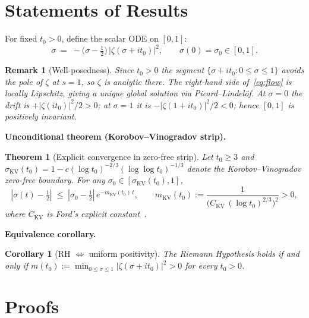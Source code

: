 \documentclass[11pt]{article}
\newtheorem{theorem}{Theorem}
\newtheorem{corollary}{Corollary}
\newtheorem{remark}{Remark}
\begin{document}
\section{Statements of Results}

For fixed $t_0>0$, define the scalar ODE on $[0,1]$:
\begin{equation}\label{eq:flow}
  \dot\sigma \;=\; -\bigl(\sigma-\tfrac12\bigr)\,|\zeta(\sigma+it_0)|^2,
  \qquad \sigma(0)=\sigma_0\in[0,1].
\end{equation}

\begin{remark}[Well-posedness]\label{rem:wp}
Since $t_0>0$ the segment $\{\sigma+it_0:0\le\sigma\le1\}$ avoids the
pole of $\zeta$ at $s=1$, so $\zeta$ is analytic there.
The right-hand side of~\eqref{eq:flow} is locally Lipschitz, giving a
unique global solution via Picard--Lindel\"of.
At $\sigma=0$ the drift is $+|\zeta(it_0)|^2/2>0$; at $\sigma=1$ it is
$-|\zeta(1+it_0)|^2/2<0$; hence $[0,1]$ is positively invariant.
\end{remark}

\noindent\textbf{Unconditional theorem (Korobov--Vinogradov strip).}

\begin{theorem}[Explicit convergence in zero-free strip]\label{thm:kv}
Let $t_0\ge3$ and $\sigma_{\mathrm{KV}}(t_0)=1-c(\log t_0)^{-2/3}
(\log\log t_0)^{-1/3}$ denote the Korobov--Vinogradov zero-free boundary.
For any $\sigma_0\in[\sigma_{\mathrm{KV}}(t_0),1]$,
\[
  |\sigma(t)-\tfrac12|
  \;\le\;
  |\sigma_0-\tfrac12|\,
  e^{-m_{\mathrm{KV}}(t_0)\,t},
  \qquad
  m_{\mathrm{KV}}(t_0)
  :=\frac{1}{\bigl(C_{\mathrm{KV}}\,(\log t_0)^{2/3}\bigr)^2}>0,
\]
where $C_{\mathrm{KV}}$ is Ford's explicit constant~\cite[Thm.\,2]{ford}.
\end{theorem}

\noindent\textbf{Equivalence corollary.}

\begin{tcolorbox}[colback=gray!10,colframe=black,title=Equivalence]
\begin{corollary}[RH $\Leftrightarrow$ uniform positivity]\label{cor:equiv}
The Riemann Hypothesis holds if and only if
$m(t_0):=\min_{0\le\sigma\le1}|\zeta(\sigma+it_0)|^2>0$ for every $t_0>0$.
\end{corollary}
\end{tcolorbox}

\section{Proofs}
\end{document}
